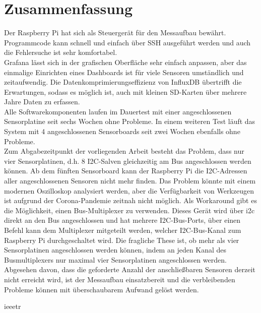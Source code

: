 \documentclass[a4paper,oneside,12pt,titlepage]{scrartcl}   %
\begin{document}
\section{Zusammenfassung}
Der Raspberry Pi hat sich als Steuergerät für den Messaufbau bewährt.
Programmcode kann schnell und einfach über SSH ausgeführt werden und auch die Fehlersuche ist sehr komfortabel.\\
Grafana lässt sich in der grafischen Oberfläche sehr einfach anpassen, aber das einmalige Einrichten eines Dashboards ist für viele Sensoren umständlich und zeitaufwendig.
Die Datenkomprimierungseffizienz von InfluxDB übertrifft die Erwartungen, sodass es möglich ist, auch mit kleinen SD-Karten über mehrere Jahre Daten zu erfassen.\\
Alle Softwarekomponenten laufen im Dauertest mit einer angeschlossenen Sensorplatine seit sechs Wochen ohne Probleme.
In einem weiteren Test läuft das System mit 4 angeschlossenen Sensorboards seit zwei Wochen ebenfalls ohne Probleme.\\
Zum Abgabezeitpunkt der vorliegenden Arbeit besteht das Problem, dass nur vier Sensorplatinen, d.h. 8 I2C-Salven gleichzeitig am Bus angeschlossen werden können.
Ab dem fünften Sensorboard kann der Raspberry Pi die I2C-Adressen aller angeschlossenen Sensoren nicht mehr finden.
Das Problem könnte mit einem modernen Oszilloskop analysiert werden, aber die Verfügbarkeit von Werkzeugen ist aufgrund der Corona-Pandemie zeitnah nicht möglich.
Als Workaround gibt es die Möglichkeit, einen Bus-Multiplexer zu verwenden.
Dieses Gerät wird über i2c direkt an den Bus angeschlossen und hat mehrere I2C-Bus-Ports, über einen Befehl kann dem Multiplexer mitgeteilt werden, welcher I2C-Bus-Kanal zum Raspberry Pi durchgeschaltet wird.
Die fragliche These ist, ob mehr als vier Sensorplatinen angeschlossen werden können, indem an jeden Kanal des Busmultiplexers nur maximal vier Sensorplatinen angeschlossen werden.\\
Abgesehen davon, dass die geforderte Anzahl der anschließbaren Sensoren derzeit nicht erreicht wird, ist der Messaufbau einsatzbereit und die verbleibenden Probleme können mit überschaubarem Aufwand gelöst werden.


 {ieeetr}
\end{document}
